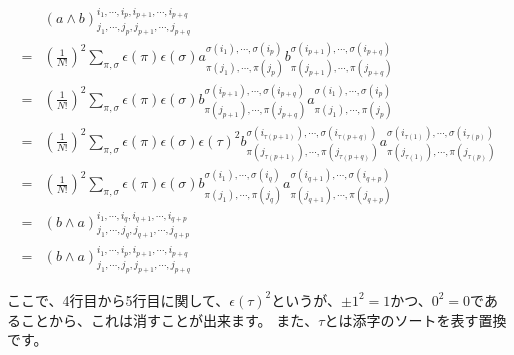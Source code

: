 \documentclass[a4paper, 10pt, dvipdfmx]{jlreq}
\begin{document}
\begin{align*}
      & \left( a \wedge b\right) ^{i_{1}, \cdots, i_{p}, i_{p+1},\cdots, i_{p+q}}_{j_{1}, \cdots, j_{p}, j_{p+1}, \cdots, j_{p+q} }                                                                                                                                                                                 \\
    = & \left(\frac{1}{N!}\right)^{2}\sum_{\pi, \sigma}\epsilon(\pi)\epsilon(\sigma)a_{\pi(j_{1}), \cdots, \pi(j_{p}) }^{ \sigma(i_{1}), \cdots, \sigma(i_{p})}b_{\pi(j_{p+1}), \cdots, \pi(j_{p+q}) }^{ \sigma(i_{p+1}), \cdots, \sigma(i_{p+q})}                                                                  \\
    = & \left(\frac{1}{N!}\right)^{2}\sum_{\pi, \sigma}\epsilon(\pi)\epsilon(\sigma)b_{\pi(j_{p+1}), \cdots, \pi(j_{p+q}) }^{ \sigma(i_{p+1}), \cdots, \sigma(i_{p+q})}a_{\pi(j_{1}), \cdots, \pi(j_{p}) }^{ \sigma(i_{1}), \cdots, \sigma(i_{p})}                                                                  \\
    = & \left(\frac{1}{N!}\right)^{2}\sum_{\pi, \sigma}\epsilon(\pi)\epsilon(\sigma)\epsilon(\tau)^2 b_{\pi(j_{\tau(p+1)}), \cdots, \pi(j_{\tau(p+q)}) }^{ \sigma(i_{\tau(p+1)}), \cdots, \sigma(i_{\tau(p+q)})}a_{\pi(j_{\tau(1)}), \cdots, \pi(j_{\tau(p)}) }^{ \sigma(i_{\tau(1)}), \cdots, \sigma(i_{\tau(p)})} \\
    = & \left(\frac{1}{N!}\right)^{2}\sum_{\pi, \sigma}\epsilon(\pi)\epsilon(\sigma)b_{\pi(j_1), \cdots, \pi(j_q) }^{ \sigma(i_1), \cdots, \sigma(i_q)}a_{\pi(j_{q+1}), \cdots, \pi(j_{q+p}) }^{ \sigma(i_{q+1}), \cdots, \sigma(i_{q+p})}                                                                          \\
    = & \left( b \wedge a\right) ^{i_{1}, \cdots, i_{q}, i_{q+1},\cdots, i_{q+p}}_{j_{1}, \cdots, j_{q}, j_{q+1}, \cdots, j_{q+p} }                                                                                                                                                                                 \\
    = & \left( b \wedge a\right) ^{i_{1}, \cdots, i_{p}, i_{p+1},\cdots, i_{p+q}}_{j_{1}, \cdots, j_{p}, j_{p+1}, \cdots, j_{p+q} }
\end{align*}

ここで、4行目から5行目に関して、$\epsilon(\tau)^2$というが、${\pm 1}^2=1$かつ、$0^2=0$であることから、これは消すことが出来ます。
また、$\tau$とは添字のソートを表す置換です。
\end{document}
